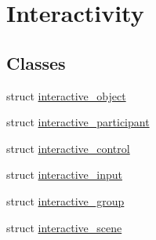 \hypertarget{group__interactivity}{}\section{Interactivity}
\label{group__interactivity}
\subsection*{Classes}
\begin{DoxyCompactItemize}
\item 
struct \mbox{\hyperlink{structinteractive__object}{interactive\+\_\+object}}
\item 
struct \mbox{\hyperlink{structinteractive__participant}{interactive\+\_\+participant}}
\item 
struct \mbox{\hyperlink{structinteractive__control}{interactive\+\_\+control}}
\item 
struct \mbox{\hyperlink{structinteractive__input}{interactive\+\_\+input}}
\item 
struct \mbox{\hyperlink{structinteractive__group}{interactive\+\_\+group}}
\item 
struct \mbox{\hyperlink{structinteractive__scene}{interactive\+\_\+scene}}
\end{DoxyCompactItemize}
